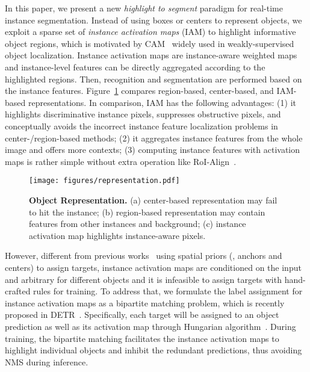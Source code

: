 \documentclass[10pt,twocolumn,letterpaper]{article}
\begin{document}
In this paper, we present a new \textit{highlight to segment} paradigm for real-time instance segmentation. 
Instead of using boxes or centers to represent objects, we exploit a sparse set of \textit{instance activation maps} (IAM) to highlight informative object regions, which is motivated by CAM~\cite{zhou2015cnnlocalization} widely used in weakly-supervised object localization.
Instance activation maps are instance-aware weighted maps and instance-level features can be directly aggregated according to the highlighted regions.
Then, recognition and segmentation are performed based on the instance features.
Figure~\ref{fig:represent_object} compares region-based, center-based, and IAM-based representations.
In comparison, IAM has the following advantages: (1) it highlights discriminative instance pixels, suppresses obstructive pixels, and conceptually avoids the incorrect instance feature localization problems in center-/region-based methods; (2) it aggregates instance features from the whole image and offers more contexts; (3) computing instance features with activation maps is rather simple without extra operation like RoI-Align~\cite{MaskRCNNHeGDG17}.
\begin{figure}
    \centering
    \texttt{[image: figures/representation.pdf]}
    \caption{\textbf{Object Representation.} (a) center-based representation may fail to hit the instance;
(b) region-based representation may contain features from other instances and background; 
(c) instance activation map highlights instance-aware pixels.}
    \label{fig:represent_object}
    \vspace{-15pt}
\end{figure}
However, different from previous works~\cite{MaskRCNNHeGDG17,FCOSTianSCH19,SOLOV2WangZKLS20} using spatial priors (\ie, anchors and centers) to assign targets, instance activation maps are conditioned on the input and arbitrary for different objects and it is infeasible to assign targets with hand-crafted rules for training.
To address that, we formulate the label assignment for instance activation maps as a bipartite matching problem, which is recently proposed in DETR~\cite{DETRCarionMSUKZ20}.
Specifically, each target will be assigned to an object prediction as well as its activation map through Hungarian algorithm~\cite{HungarianStewartAN16}.
During training, the bipartite matching facilitates the instance activation maps to highlight individual objects and inhibit the redundant predictions, thus avoiding NMS during inference.
\end{document}
